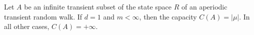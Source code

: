 Let \(A\) be an infinite transient subset of the state space \(R\) of an aperiodic transient random walk. If \(d = 1\) and \(m < \infty\), then the capacity \(C(A) = |\mu|\). In all other cases, \(C(A) = +\infty\).
